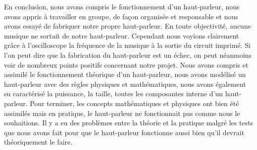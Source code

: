 

En conclusion, nous avons compris le fonctionnement d’un haut-parleur,  nous avons appris à travailler en groupe, de façon organisée et responsable et nous avons essayé de fabriquer notre propre haut-parleur.  En toute objectivité, aucune musique ne sortait de notre haut-parleur.  Cependant nous voyions clairement grâce à l’oscilloscope la fréquence de la musique à la sortie du circuit imprimé.
Si l’on peut dire que la fabrication du haut-parleur est un échec, on peut néanmoins voir de nombreux points positifs concernant notre projet.  Nous avons compris et assimilé le fonctionnement théorique d’un haut-parleur, nous avons modélisé un haut-parleur avec des règles physiques et mathématiques, nous avons également su caractérisé la puissance, la taille, toutes les composantes interne d’un haut-parleur. 
Pour terminer, les concepts mathématiques et physiques ont bien été assimilés mais en pratique, le haut-parleur ne fonctionnait pas comme nous le souhaitions.  Il y a eu des problèmes entre la théorie et la pratique malgré les tests que nous avons fait pour que le haut-parleur fonctionne aussi bien qu’il devrait théoriquement le faire. 


